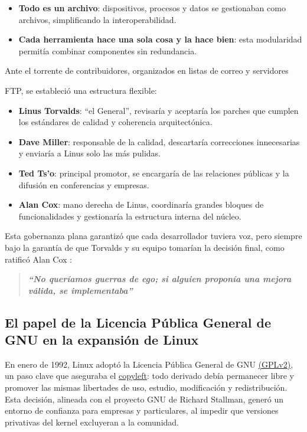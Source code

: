 \documentclass[a4paper,12pt]{article}
\begin{document}
\begin{itemize}[label=$\bullet$, itemsep=0.5em]
    \item \textbf{Todo es un archivo}: dispositivos, procesos y datos se
    gestionaban como archivos, simplificando la interoperabilidad.     
    \item \textbf{Cada herramienta hace una sola cosa y la hace bien}:
    esta modularidad permitía combinar componentes sin redundancia.
\end{itemize}

Ante el torrente de contribuidores, organizados en listas de correo y servidores

FTP, se estableció una estructura flexible:
\begin{itemize}[label=$\bullet$, itemsep=0.5em]
    \item \textbf{Linus Torvalds}: ``el General'', revisaría y aceptaría los parches que
    cumplen los estándares de calidad y coherencia arquitectónica. 
    \item \textbf{Dave Miller}: responsable de la calidad, descartaría correcciones
    innecesarias y enviaría a Linus solo las más pulidas.  
    \item \textbf{Ted Ts’o}: principal promotor, se encargaría de las relaciones
    públicas y la difusión en conferencias y empresas.  
    \item \textbf{Alan Cox}: mano derecha de Linus, coordinaría grandes bloques de
    funcionalidades y gestionaría la estructura interna del núcleo.
\end{itemize} 

Esta gobernanza plana garantizó que cada desarrollador tuviera voz, pero siempre
bajo la garantía de que Torvalds y su equipo tomarían la decisión final, como
ratificó Alan Cox \cite{torvalds_just_2002}:

\begin{quote}
    \textbf{\textit{“No queríamos guerras de ego; si alguien proponía una mejora válida, se
    implementaba”}} 
\end{quote}
\newpage

\subsection{El papel de la Licencia Pública General de GNU en la expansión de Linux}

En enero de 1992, Linux adoptó la Licencia Pública General de GNU \hyperlink{gpl}{(GPLv2)}, un
paso clave que aseguraba el \hyperlink{copyleft}{copyleft}: todo derivado debía permanecer libre y
promover las mismas libertades de uso, estudio, modificación y redistribución. 
Esta decisión, alineada con el proyecto GNU de Richard Stallman, generó un
entorno de confianza para empresas y particulares, al impedir que versiones
privativas del kernel excluyeran a la comunidad.
\end{document}
